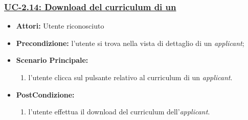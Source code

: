 \subsubsection{\underline{UC-2.14: Download del curriculum di un \applicant}}
\begin{itemize}
	\item \textbf{Attori:} Utente riconosciuto
	\item \textbf{Precondizione:}  l'utente si trova nella vista di dettaglio di un \textit{applicant};
	\item \textbf{Scenario Principale:}
	\begin{enumerate}
		\item l'utente clicca sul pulsante relativo al curriculum di un \textit{applicant}.
	\end{enumerate}
	\item \textbf{PostCondizione:} 
	\begin{enumerate}
		\item l'utente effettua il download del curriculum dell'\textit{applicant}.
	\end{enumerate}
	
\end{itemize}

